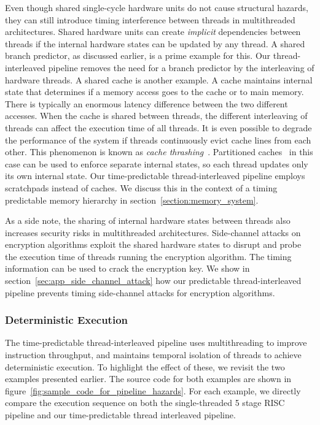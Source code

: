 Even though shared single-cycle hardware units do not cause structural hazards, they can still introduce timing interference between threads in multithreaded architectures. 
Shared hardware units can create \emph{implicit} dependencies between threads if the internal hardware states can be updated by any thread. 
A shared branch predictor, as discussed earlier, is a prime example for this. 
Our thread-interleaved pipeline removes the need for a branch predictor by the interleaving of hardware threads.  
A shared cache is another example.   
A cache maintains internal state that determines if a memory access goes to the cache or to main memory.
There is typically an enormous latency difference between the two different accesses.
When the cache is shared between threads, the different interleaving of threads can affect the execution time of all threads. 
It is even possible to degrade the performance of the system if threads continuously evict cache lines from each other. 
This phenomenon is known as \emph{cache thrashing}~.
Partitioned caches~ in this case can be used to enforce separate internal states, so each thread updates only its own internal state.  
Our time-predictable thread-interleaved pipeline employs scratchpads instead of caches.
We discuss this in the context of a timing predictable memory hierarchy in section~\ref{section:memory_system}.   

As a side note, the sharing of internal hardware states between threads also increases security risks in multithreaded architectures. 
Side-channel attacks on encryption algorithms exploit the shared hardware states to disrupt and probe the execution time of threads running the encryption algorithm.
The timing information can be used to crack the encryption key.
We show in section~\ref{sec:app_side_channel_attack} how our predictable thread-interleaved pipeline prevents timing side-channel attacks for encryption algorithms.   

\subsubsection{Deterministic Execution}
The time-predictable thread-interleaved pipeline uses multithreading to improve instruction throughput, and maintains temporal isolation of threads to achieve deterministic execution.  
To highlight the effect of these, we revisit the two examples presented earlier.
The source code for both examples are shown in figure~\ref{fig:sample_code_for_pipeline_hazards}.
For each example, we directly compare the execution sequence on both the single-threaded 5 stage RISC pipeline and our time-predictable thread interleaved pipeline.


